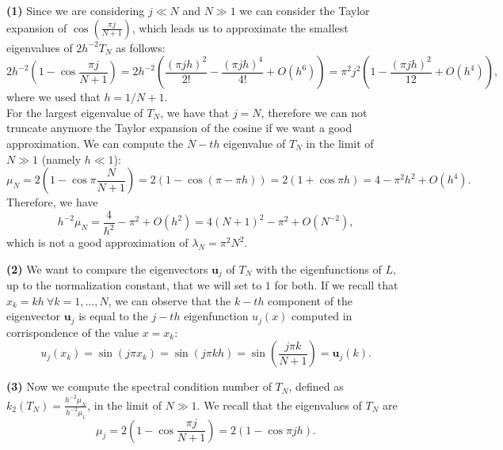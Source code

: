 \documentclass[a4paper,11pt]{article}
\begin{document}
\noindent \textbf{(1)} Since we are considering $j\ll N$ and $N\gg1$ we can consider the Taylor expansion of $\cos \left( \frac{\pi j }{N+1}\right) $,
which leads us to approximate the smallest eigenvalues of $2h^{-2} T_N$ as follows:
\begin{equation}\label{Eq:Taylor_exp_small_j}
	2h^{-2} \left( 1- \cos \frac{\pi j }{N+1} \right)  = 2h^{-2} \left(\frac{(\pi j h)^2}{2!} - \frac{(\pi j h)^4}{4!} + O(h^6)\right)  = \pi^2 j^2 \left( 1- \frac{(\pi j h)^2}{12} + O(h^4) \right),
\end{equation}
where we used that $h=1/N+1$.\\
\noindent For the largest eigenvalue of $T_N$, we have that $j = N$, therefore we can not truncate anymore the Taylor expansion of the cosine if we want a good approximation. We can compute the $N-th$ eigenvalue of $T_N$ in the limit of $N\gg 1$ (namely $h\ll 1$):
\begin{equation}\label{Eq:Taylor_exp_big_j}
	\mu_N = 2\left( 1-\cos\pi  \frac{N}{N+1}\right)   =2(1-\cos (\pi -\pi h) ) = 2(1+\cos\pi h) = 4 - \pi^2 h^2 + O(h^4).
\end{equation}
Therefore, we have
\begin{equation}\label{key}
	h^{-2} \mu_N = \frac{4}{h^2} - \pi^2 + O(h^2) =4(N+1)^2 - \pi^2 + O(N^{-2}),
\end{equation}
which is not a good approximation of $\lambda_N = \pi^2 N^2$.

\noindent \textbf{(2)} We want to compare the eigenvectors $\textbf{u}_j$ of $T_N$ with the eigenfunctions of $L$, up to the normalization constant, that we will set to $1$ for both. If we recall that $x_k = k h\ \forall k = 1,\dots, N$, we can observe that the $k-th$ component of the eigenvector $\textbf{u}_j$ is equal to the $j-th$ eigenfunction $u_j(x)$ computed in corrispondence of the value $x=x_k$:
\begin{equation}
	u_j(x_k) = \sin(j \pi x_k) = \sin ( j \pi k h ) = \sin\left( \frac{j \pi k}{N+1}\right)  = \textbf{u}_j(k).
\end{equation}

\noindent \textbf{(3)}  Now we compute the spectral condition number of $T_N$, defined as 	$k_2(T_N) = \frac{h^{-2}\mu_N}{h^{-2}\mu_1}$, in the limit of $N\gg 1$. We recall that the eigenvalues of $T_N$ are
\begin{equation}\label{key}
	\mu_j = 2\left( 1-\cos \frac{\pi j}{N+1}\right) = 2\left( 1-\cos \pi j h\right).
\end{equation}
\end{document}
